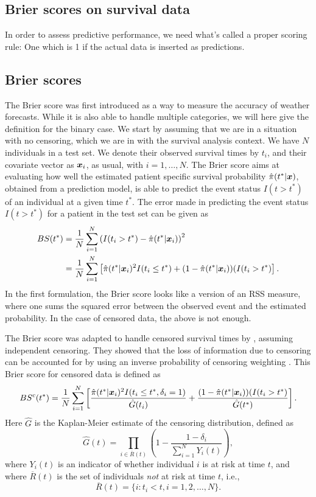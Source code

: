 \subsection{Brier scores on survival data}
In order to assess predictive performance, we need what's called a proper scoring rule: One which is 1 if the actual data is inserted as predictions.

\subsection{Brier scores}
The Brier score \citep{brier1950} was first introduced as a way to measure the accuracy of weather forecasts. While it is also able to handle multiple categories, we will here give the definition for the binary case.
We start by assuming that we are in a situation with no censoring, which we are in with the survival analysis context.
We have $N$ individuals in a test set.
We denote their observed survival times by $t_i$, and their covariate vector as $\bm{x}_i$, as usual, with $i=1,\ldots,N$. The Brier score aims at evaluating how well the estimated patient specific survival probability $\hat{\pi}(t^*|\bm{x})$, obtained from a prediction model, is able to predict the event status $I(t>t^*)$ of an individual at a given time $t^*$.
The error made in predicting the event status $I(t>t^*)$ for a patient in the test set can be given as
\begin{align*}
BS(t^*)&=\frac{1}{N}\sum_{i=1}^N\left(I(t_i>t^*)-\hat{\pi}(t^*|\bm{x}_i)\right)^2 \\
    &=\frac{1}{N}\sum_{i=1}^N\left[\hat{\pi}(t^*|\bm{x}_i)^2I(t_i\leq t^*)+(1-\hat{\pi}(t^*|\bm{x}_i))(I(t_i>t^*)\right].
\end{align*}
In the first formulation, the Brier score looks like a version of an RSS measure, where one sums the squared error between the observed event and the estimated probability.
In the case of censored data, the above is not enough.

The Brier score was adapted to handle censored survival times by \citet{graf}, assuming independent censoring.
They showed that the loss of information due to censoring can be accounted for by using an inverse probability of censoring weighting \citep{bovelstadborgan}.
This Brier score for censored data is defined as
\begin{equation*}
    BS^c(t^*)=\frac{1}{N}\sum_{i=1}^N\left[\frac{\hat{\pi}(t^*|\bm{x}_i)^2I(t_i\leq t^*,\delta_i=1)}{\hat{G}(t_i)}+\frac{(1-\hat{\pi}(t^*|\bm{x}_i))(I(t_i>t^*)}{\hat{G}(t^*)}\right].
\end{equation*}
Here $\hat{G}$ is the Kaplan-Meier estimate of the censoring distribution, defined as
\begin{equation*}
    \hat{G}(t)=\prod_{i\in \overline{R}(t)}\left(1-\frac{1-\delta_i}{\sum_{i=1}^NY_i(t)}\right),
\end{equation*}
where $Y_i(t)$ is an indicator of whether individual $i$ is at risk at time $t$, and where $\overline{R}(t)$ is the set of individuals \textit{not} at risk at time $t$, i.e.,
\begin{equation*}
    \overline{R}(t)=\{i\colon t_i<t,i=1,2,\ldots,N\}.
\end{equation*}


